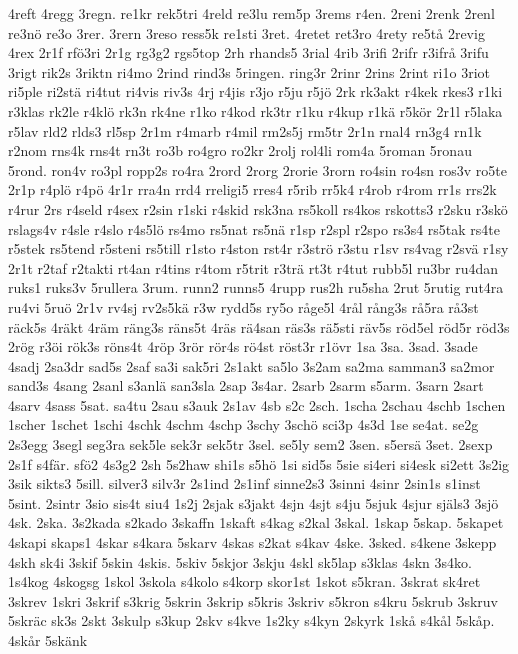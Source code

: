 {4reft
4regg
3regn.
re1kr
rek5tri
4reld
re3lu
rem5p
3rems
r4en.
2reni
2renk
2renl
re3nö
re3o
3rer.
3rern
3reso
ress5k
re1sti
3ret.
4retet
ret3ro
4rety
re5tå
2revig
4rex
2r1f
rfö3ri
2r1g
rg3g2
rgs5top
2rh
rhands5
3rial
4rib
3rifi
2rifr
r3ifrå
3rifu
3rigt
rik2s
3riktn
ri4mo
2rind
rind3s
5ringen.
ring3r
2rinr
2rins
2rint
ri1o
3riot
ri5ple
ri2stä
ri4tut
ri4vis
riv3s
4rj
r4jis
r3jo
r5ju
r5jö
2rk
rk3akt
r4kek
rkes3
r1ki
r3klas
rk2le
r4klö
rk3n
rk4ne
r1ko
r4kod
rk3tr
r1ku
r4kup
r1kä
r5kör
2r1l
r5laka
r5lav
rld2
rlds3
rl5sp
2r1m
r4marb
r4mil
rm2s5j
rm5tr
2r1n
rnal4
rn3g4
rn1k
r2nom
rns4k
rns4t
rn3t
ro3b
ro4gro
ro2kr
2rolj
rol4li
rom4a
5roman
5ronau
5rond.
ron4v
ro3pl
ropp2s
ro4ra
2rord
2rorg
2rorie
3rorn
ro4sin
ro4sn
ros3v
ro5te
2r1p
r4plö
r4pö
4r1r
rra4n
rrd4
rreligi5
rres4
r5rib
rr5k4
r4rob
r4rom
rr1s
rrs2k
r4rur
2rs
r4seld
r4sex
r2sin
r1ski
r4skid
rsk3na
rs5koll
rs4kos
rskotts3
r2sku
r3skö
rslags4v
r4sle
r4slo
r4s5lö
rs4mo
rs5nat
rs5nä
r1sp
r2spl
r2spo
rs3s4
rs5tak
rs4te
r5stek
rs5tend
r5steni
rs5till
r1sto
r4ston
rst4r
r3strö
r3stu
r1sv
rs4vag
r2svä
r1sy
2r1t
r2taf
r2takti
rt4an
r4tins
r4tom
r5trit
r3trä
rt3t
r4tut
rubb5l
ru3br
ru4dan
ruks1
ruks3v
5rullera
3rum.
runn2
runns5
4rupp
rus2h
ru5sha
2rut
5rutig
rut4ra
ru4vi
5ruö
2r1v
rv4sj
rv2s5kä
r3w
rydd5s
ry5o
råge5l
4rål
rång3s
rå5ra
rå3st
räck5s
4räkt
4räm
räng3s
räns5t
4räs
rä4san
räs3s
rä5sti
räv5s
röd5el
röd5r
röd3s
2rög
r3öi
rök3s
röns4t
4röp
3rör
rör4s
rö4st
röst3r
r1övr
1sa
3sa.
3sad.
3sade
4sadj
2sa3dr
sad5s
2saf
sa3i
sak5ri
2s1akt
sa5lo
3s2am
sa2ma
samman3
sa2mor
sand3s
4sang
2sanl
s3anlä
san3sla
2sap
3s4ar.
2sarb
2sarm
s5arm.
3sarn
2sart
4sarv
4sass
5sat.
sa4tu
2sau
s3auk
2s1av
4sb
s2c
2sch.
1scha
2schau
4schb
1schen
1scher
1schet
1schi
4schk
4schm
4schp
3schy
3schö
sci3p
4s3d
1se
se4at.
se2g
2s3egg
3segl
seg3ra
sek5le
sek3r
sek5tr
3sel.
se5ly
sem2
3sen.
s5ersä
3set.
2sexp
2s1f
s4fär.
sfö2
4s3g2
2sh
5s2haw
shi1s
s5hö
1si
sid5s
5sie
si4eri
si4esk
si2ett
3s2ig
3sik
sikts3
5sill.
silver3
silv3r
2s1ind
2s1inf
sinne2s3
3sinni
4sinr
2sin1s
s1inst
5sint.
2sintr
3sio
sis4t
siu4
1s2j
2sjak
s3jakt
4sjn
4sjt
s4ju
5sjuk
4sjur
själs3
3sjö
4sk.
2ska.
3s2kada
s2kado
3skaffn
1skaft
s4kag
s2kal
3skal.
1skap
5skap.
5skapet
4skapi
skaps1
4skar
s4kara
5skarv
4skas
s2kat
s4kav
4ske.
3sked.
s4kene
3skepp
4skh
sk4i
3skif
5skin
4skis.
5skiv
5skjor
3skju
4skl
sk5lap
s3klas
4skn
3s4ko.
1s4kog
4skogsg
1skol
3skola
s4kolo
s4korp
skor1st
1skot
s5kran.
3skrat
sk4ret
3skrev
1skri
3skrif
s3krig
5skrin
3skrip
s5kris
3skriv
s5kron
s4kru
5skrub
3skruv
5skräc
sk3s
2skt
3skulp
s3kup
2skv
s4kve
1s2ky
s4kyn
2skyrk
1skå
s4kål
5skåp.
4skår
5skänk
}
